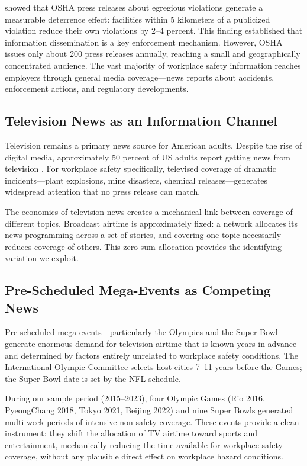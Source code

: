 \documentclass[12pt]{article}
\begin{document}
\citet{Johnson2020} showed that OSHA press releases about egregious violations generate a measurable deterrence effect: facilities within 5 kilometers of a publicized violation reduce their own violations by 2--4 percent. This finding established that information dissemination is a key enforcement mechanism. However, OSHA issues only about 200 press releases annually, reaching a small and geographically concentrated audience. The vast majority of workplace safety information reaches employers through general media coverage---news reports about accidents, enforcement actions, and regulatory developments.

\subsection{Television News as an Information Channel}

Television remains a primary news source for American adults. Despite the rise of digital media, approximately 50 percent of US adults report getting news from television \citep{PewResearch2023}. For workplace safety specifically, televised coverage of dramatic incidents---plant explosions, mine disasters, chemical releases---generates widespread attention that no press release can match.

The economics of television news creates a mechanical link between coverage of different topics. Broadcast airtime is approximately fixed: a network allocates its news programming across a set of stories, and covering one topic necessarily reduces coverage of others. This zero-sum allocation provides the identifying variation we exploit.

\subsection{Pre-Scheduled Mega-Events as Competing News}

Pre-scheduled mega-events---particularly the Olympics and the Super Bowl---generate enormous demand for television airtime that is known years in advance and determined by factors entirely unrelated to workplace safety conditions. The International Olympic Committee selects host cities 7--11 years before the Games; the Super Bowl date is set by the NFL schedule.

During our sample period (2015--2023), four Olympic Games (Rio 2016, PyeongChang 2018, Tokyo 2021, Beijing 2022) and nine Super Bowls generated multi-week periods of intensive non-safety coverage. These events provide a clean instrument: they shift the allocation of TV airtime toward sports and entertainment, mechanically reducing the time available for workplace safety coverage, without any plausible direct effect on workplace hazard conditions.
\end{document}
